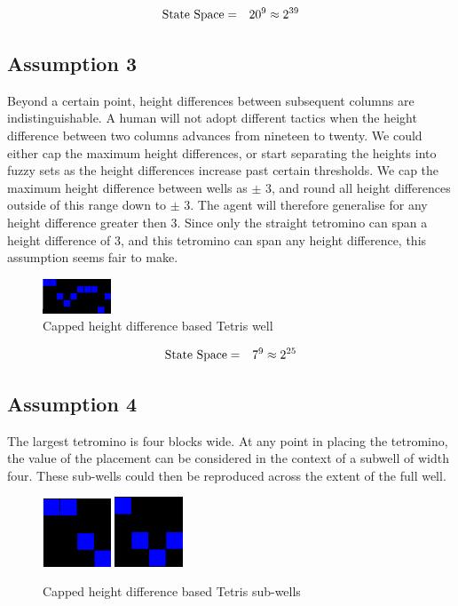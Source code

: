 \documentclass{rucsthesis}
\begin{document}
\begin{eqnarray}
\centering
\textrm{State Space} & = & 20^{9} \approx 2^{39}
\end{eqnarray}

\subsection*{Assumption 3}

Beyond a certain point, height differences between subsequent columns are indistinguishable. A human will not adopt different tactics when the height difference between two columns advances from nineteen to twenty. We could either cap the maximum height differences, or start separating the heights into fuzzy sets as the height differences increase past certain thresholds. We cap the maximum height difference between wells as $\pm$ 3, and round all height differences outside of this range down to $\pm$ 3. The agent will therefore generalise for any height difference greater then 3. Since only the straight tetromino can span a height difference of 3, and this tetromino can span any height difference, this assumption seems fair to make. 

\begin{figure}[h]
\centering
\includegraphics[width=0.8in]{capdiffheightwell.png}
\caption{Capped height difference based Tetris well}
\label{fig:capdiffheightwell}
\end{figure}

\begin{eqnarray}
\centering
\textrm{State Space} & = & 7^{9} \approx 2^{25}
\end{eqnarray}

\subsection*{Assumption 4}

The largest tetromino is four blocks wide. At any point in placing the tetromino, the value of the placement can be considered in the context of a subwell of width four. These sub-wells could then be reproduced across the extent of the full well.

\begin{figure}[h]
\centering
\includegraphics[width=0.8in]{reducedwell.png}
\includegraphics[width=0.8in]{reducedwell2.png}
\caption{Capped height difference based Tetris sub-wells}
\label{fig:redwell}
\end{figure}
\end{document}
